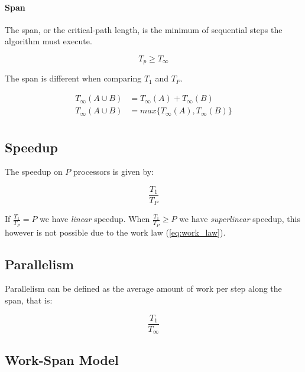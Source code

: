 \paragraph{Span}

The span, or the critical-path length, is the minimum of sequential steps the algorithm must execute.

\begin{equation}\label{eq:span_law}
    T_p \ge T_{\infty}
\end{equation}

The span is different when comparing $T_1$ and $T_P$.

\begin{equation}
    \begin{split}
        T_{\infty} (A \cup B) & = T_{\infty}(A) + T_{\infty}(B)\\
        T_{\infty} (A \cup B) & = max\{T_{\infty}(A), T_{\infty}(B)\}\\
    \end{split}
\end{equation}

\subsection{Speedup}

The speedup on $P$ processors is given by:

\begin{equation}
    \frac{T_1}{T_P}
\end{equation}

If $\frac{T_1}{T_P} = P$ we have \textit{linear} speedup.
When $\frac{T_1}{T_P} \ge P$ we have \textit{superlinear} speedup,
this however is not possible due to the work law (\autoref{eq:work_law}).

\subsection{Parallelism}

Parallelism can be defined as the average amount of work per step along the span, that is:

\begin{equation}
    \frac{T_1}{T_\infty}
\end{equation}

\subsection{Work-Span Model}

